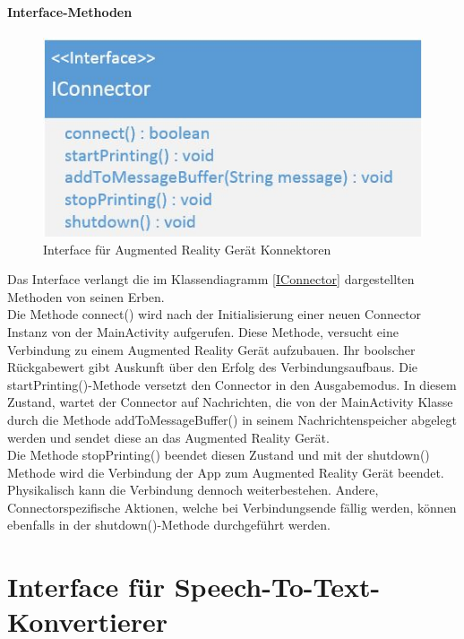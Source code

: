\paragraph{Interface-Methoden}
\begin{figure}
	\includegraphics[width=\linewidth]{../images/iconnector.jpg}
	\caption{Interface für Augmented Reality Gerät Konnektoren}
	\label{fig:IConnector}
\end{figure}
Das Interface verlangt die im Klassendiagramm \ref{IConnector} dargestellten Methoden von seinen Erben.\\
Die Methode connect() wird nach der Initialisierung einer neuen Connector Instanz von der MainActivity aufgerufen. Diese Methode, versucht eine Verbindung zu einem Augmented Reality Gerät aufzubauen. Ihr boolscher Rückgabewert gibt Auskunft über den Erfolg des Verbindungsaufbaus.
Die startPrinting()-Methode versetzt den Connector in den Ausgabemodus. In diesem Zustand, wartet der Connector auf Nachrichten, die von der MainActivity Klasse durch die Methode addToMessageBuffer() in seinem Nachrichtenspeicher abgelegt werden und sendet diese an das Augmented Reality Gerät.\\
Die Methode stopPrinting() beendet diesen Zustand und mit der shutdown() Methode wird die Verbindung der App zum Augmented Reality Gerät beendet. Physikalisch kann die Verbindung dennoch weiterbestehen. Andere, Connectorspezifische Aktionen, welche bei Verbindungsende fällig werden, können ebenfalls in der shutdown()-Methode durchgeführt werden.
\section{Interface für Speech-To-Text-Konvertierer}
